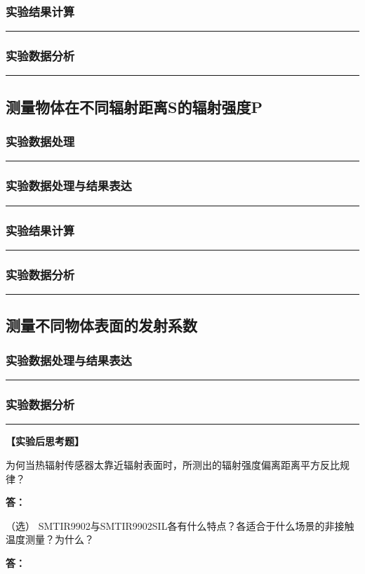 \documentclass[dvipsnames, svgnames,a4paper,11pt]{article}
\newcommand{\answerblank}[1][3.8cm]{%
  \par\nopagebreak[4]\noindent\textbf{答：}\par\nopagebreak[4]\vspace*{#1}}
\newcommand{\recordblank}[1]{%
  \par\noindent\rule{0.95\linewidth}{0pt}\rule{0pt}{#1}\par}
\begin{document}
\subsubsection{实验结果计算}
\recordblank{3.2cm}
\subsubsection{实验数据分析}
\recordblank{3.2cm}
\subsection{测量物体在不同辐射距离S的辐射强度P}
\subsubsection{实验数据处理}
\recordblank{3.2cm}
\subsubsection{实验数据处理与结果表达}
\recordblank{3.2cm}
\subsubsection{实验结果计算}
\recordblank{3.2cm}
\subsubsection{实验数据分析}
\recordblank{3.2cm}
\subsection{测量不同物体表面的发射系数}
\subsubsection{实验数据处理与结果表达}
\recordblank{3.2cm}
\subsubsection{实验数据分析}
\recordblank{3.2cm}
\textbf{【实验后思考题】}


\begin{question}
	为何当热辐射传感器太靠近辐射表面时，所测出的辐射强度偏离距离平方反比规律？
\end{question}
\answerblank[3.8cm]



\begin{question}
	（选） SMTIR9902与SMTIR9902SIL各有什么特点？各适合于什么场景的非接触温度测量？为什么？
\end{question}
\answerblank[3.8cm]
\end{document}

